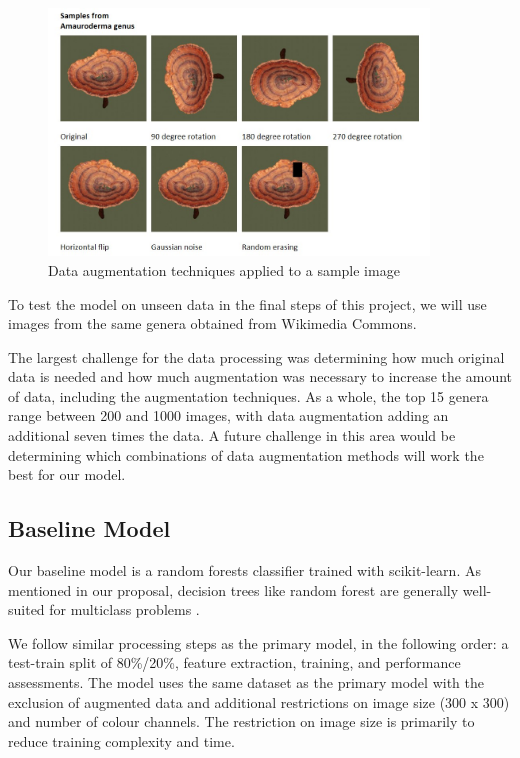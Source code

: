 \documentclass{article} %
\begin{document}
\begin{figure}[h]
    \begin{center}
    \includegraphics[width=0.9\textwidth]{figures/data_aug.jpg}
    \end{center}
    \caption{Data augmentation techniques applied to a sample image}
\end{figure}

\FloatBarrier

To test the model on unseen data in the final steps of this project, we will use images from the same genera obtained from Wikimedia Commons.

The largest challenge for the data processing was determining how much original data is needed and how much augmentation was necessary to increase the amount of data, including the augmentation techniques. As a whole, the top 15 genera range between 200 and 1000 images, with data augmentation adding an additional seven times the data. A future challenge in this area would be determining which combinations of data augmentation methods will work the best for our model.

\subsection{Baseline Model}
Our baseline model is a random forests classifier trained with scikit-learn. As mentioned in our proposal, decision trees like random forest are generally well-suited for multiclass problems \citep{GallRazaviEtAl.IntroductionRandomForests.2012}.

We follow similar processing steps as the primary model, in the following order: a test-train split of 80\%/20\%, feature extraction, training, and performance assessments. The model uses the same dataset as the primary model with the exclusion of augmented data and additional restrictions on image size (300 x 300) and number of colour channels. The restriction on image size is primarily to reduce training complexity and time.
\end{document}
